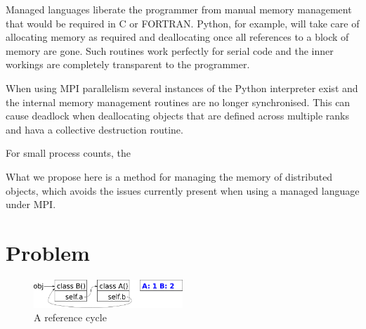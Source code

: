 \documentclass[10pt,journal,compsoc]{IEEEtran}
\begin{document}
Managed languages liberate the programmer from manual memory management that would be required in C or FORTRAN.
Python, for example, will take care of allocating memory as required and deallocating once all references to a block of memory are gone.
Such routines work perfectly for serial code and the inner workings are completely transparent to the programmer.

When using MPI parallelism several instances of the Python interpreter exist and the internal memory management routines are no longer synchronised.
This can cause deadlock when deallocating objects that are defined across multiple ranks and hava a collective destruction routine.

For small process counts, the

What we propose here is a method for managing the memory of distributed objects, which avoids the issues currently present when using a managed language under MPI.



\section{Problem}
\label{sec:problem}


\begin{figure}
	\includegraphics[width=0.5\textwidth]{gc_generational/2.png}
	\caption{A reference cycle}
	\label{fig:ref_cycle}
\end{figure}
\end{document}
